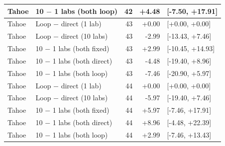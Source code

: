 \begin{longtable}{llrrl}
Tahoe & 10 $-$ 1 labs (both loop) & 42 & +4.48 & [-7.50, +17.91] \\
\midrule
Tahoe & Loop $-$ direct (1 lab) & 43 & +0.00 & [+0.00, +0.00] \\
Tahoe & Loop $-$ direct (10 labs) & 43 & -2.99 & [-13.43, +7.46] \\
Tahoe & 10 $-$ 1 labs (both fixed) & 43 & +2.99 & [-10.45, +14.93] \\
Tahoe & 10 $-$ 1 labs (both direct) & 43 & -4.48 & [-19.40, +8.96] \\
Tahoe & 10 $-$ 1 labs (both loop) & 43 & -7.46 & [-20.90, +5.97] \\
\midrule
Tahoe & Loop $-$ direct (1 lab) & 44 & +0.00 & [+0.00, +0.00] \\
Tahoe & Loop $-$ direct (10 labs) & 44 & -5.97 & [-19.40, +7.46] \\
Tahoe & 10 $-$ 1 labs (both fixed) & 44 & +5.97 & [-7.46, +17.91] \\
Tahoe & 10 $-$ 1 labs (both direct) & 44 & +8.96 & [-4.48, +22.39] \\
Tahoe & 10 $-$ 1 labs (both loop) & 44 & +2.99 & [-7.46, +13.43] \\
\midrule
\bottomrule
\end{longtable}
